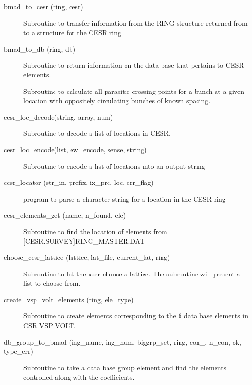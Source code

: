 \begin{description}

\item[bmad\_to\_cesr (ring, cesr)] \Newline
Subroutine to transfer information from the RING structure returned from 
 to a structure for the CESR ring 

\item[bmad\_to\_db (ring, db)] \Newline
Subroutine to return information on the data base that pertains to CESR elements. 

\item[\protect\parbox{6in}{cesr\_crossings (i\_train, j\_car, species, n\_trains\_tot, 
\\ \hspace*{2in}n\_cars, cross\_positions, n\_car\_spacing, train\_spacing)}] \Newline
Subroutine to calculate all parasitic crossing points for a bunch at a given location 
with oppositely circulating bunches of known spacing. 

\item[cesr\_loc\_decode(string, array, num)] \Newline 
     Subroutine to decode a list of locations in CESR.

\item[cesr\_loc\_encode(list, ew\_encode, sense, string)] \Newline 
     Subroutine to encode a list of locations into an output string

\item[cesr\_locator (str\_in, prefix, ix\_pre, loc, err\_flag)] \Newline 
     program to parse a character string for a location in the CESR ring

\item[cesr\_elements\_get (name, n\_found, ele)] \Newline 
     Subroutine to find the location of elements from [CESR.SURVEY]RING\_MASTER.DAT

\item[choose\_cesr\_lattice (lattice, lat\_file, current\_lat, ring)] \Newline
Subroutine to let the user choose a lattice. The subroutine will present a list to choose from. 

\item[create\_vsp\_volt\_elements (ring, ele\_type)] \Newline
Subroutine to create elements corresponding to the 6 data base elements in CSR VSP VOLT. 

\item[db\_group\_to\_bmad (ing\_name, ing\_num, biggrp\_set, 
ring, con\_, n\_con, ok, type\_err)] \Newline
Subroutine to take a data base group element and find the elements 
controlled along with the coefficients. 


\end{description}
